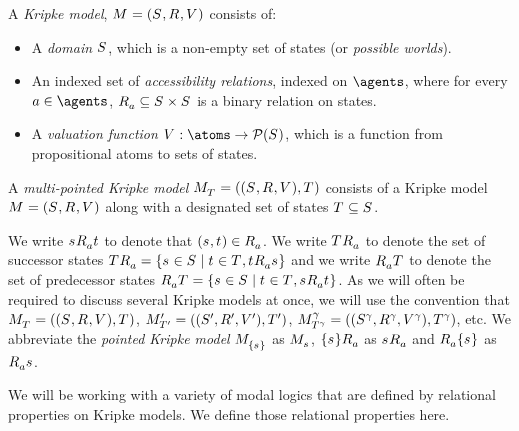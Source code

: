 \begin{definition}
A {\em Kripke model}, $\modelAndTuple$ consists of:
\begin{itemize}
    \item A {\em domain} $\states$, which is a non-empty set of states (or {\em possible worlds}).
    \item An indexed set of {\em accessibility relations}, indexed on $\agents$, where for every $\agentA \in \agents$, $\accessibility{\agentA} \subseteq \states \times \states$ is a binary relation on states.
    \item A {\em valuation function} $\valuation : \atoms \to \powerset(\states)$, which is a function from propositional atoms to sets of states.
\end{itemize}
A {\em multi-pointed Kripke model} $\pointedModelAndTuple{\statesT}$ consists of a Kripke model $\modelAndTuple$ along with a designated set of states $\statesT \subseteq \states$.
\end{definition}

We write $\stateS \accessibility{\agentA} \stateT$ to denote that $(\stateS, \stateT) \in \accessibility{\agentA}$.
We write $\successors{\agentA}{\statesT}$ to denote the set of successor states $\successors{\agentA}{\statesT} = \{\stateS \in \states \mid \stateT \in \statesT, \stateT \accessibility{\agentA} \stateS\}$ and
we write $\predecessors{\agentA}{\statesT}$ to denote the set of predecessor states $\predecessors{\agentA}{\statesT} = \{\stateS \in \states \mid \stateT \in \statesT, \stateS \accessibility{\agentA} \stateT\}$.
As we will often be required to discuss several Kripke models at once, we will use the convention that $\pointedModelAndTuple{\statesT}$, $\pointedModelAndTuple[\prime]{\statesT[\prime]}$, $\pointedModelAndTuple[\gamma]{\statesT[\gamma]}$, etc.
We abbreviate the {\em pointed Kripke model}
$\pointedModel{\{\stateS\}}$ as $\pointedModel{\stateS}$,
$\successors{\agentA}{\{\stateS\}}$ as $\successors{\agentA}{\stateS}$ and
$\predecessors{\agentA}{\{\stateS\}}$ as $\predecessors{\agentA}{\stateS}$.

We will be working with a variety of modal logics that are defined by relational properties on Kripke models.
We define those relational properties here.

